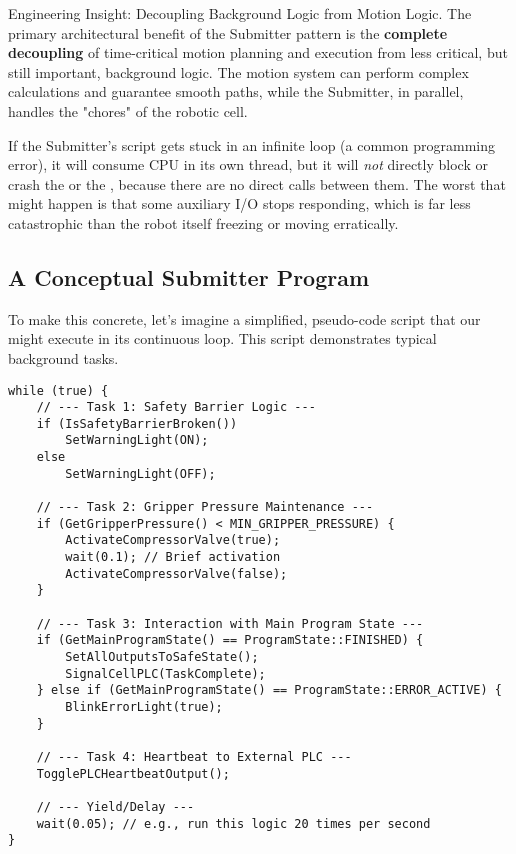 \begin{principlebox}{Engineering Insight: Decoupling Background Logic from Motion Logic.}
    The primary architectural benefit of the Submitter pattern is the \textbf{complete decoupling} of time-critical motion planning and execution from less critical, but still important, background logic. The motion system can perform complex calculations and guarantee smooth paths, while the Submitter, in parallel, handles the "chores" of the robotic cell.
    
    If the Submitter's script gets stuck in an infinite loop (a common programming error), it will consume CPU in its own thread, but it will \textit{not} directly block or crash the  or the , because there are no direct calls between them. The worst that might happen is that some auxiliary I/O stops responding, which is far less catastrophic than the robot itself freezing or moving erratically.
\end{principlebox}


\subsection{A Conceptual Submitter Program}
\label{subsec:submitter_program_conceptual}

To make this concrete, let's imagine a simplified, pseudo-code script that our  might execute in its continuous loop. This script demonstrates typical background tasks.

\begin{verbatim}
while (true) {
    // --- Task 1: Safety Barrier Logic ---
    if (IsSafetyBarrierBroken())
        SetWarningLight(ON);
    else
        SetWarningLight(OFF);

    // --- Task 2: Gripper Pressure Maintenance ---
    if (GetGripperPressure() < MIN_GRIPPER_PRESSURE) {
        ActivateCompressorValve(true);
        wait(0.1); // Brief activation
        ActivateCompressorValve(false);
    }

    // --- Task 3: Interaction with Main Program State ---
    if (GetMainProgramState() == ProgramState::FINISHED) {
        SetAllOutputsToSafeState();
        SignalCellPLC(TaskComplete);
    } else if (GetMainProgramState() == ProgramState::ERROR_ACTIVE) {
        BlinkErrorLight(true);
    }

    // --- Task 4: Heartbeat to External PLC ---
    TogglePLCHeartbeatOutput();

    // --- Yield/Delay ---
    wait(0.05); // e.g., run this logic 20 times per second
}
\end{verbatim}
\label{lst:submitter-cpp}

